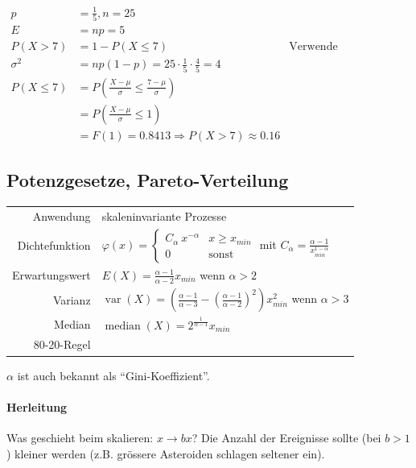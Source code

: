\documentclass[10pt,a4paper]{scrartcl}
\newif\ifincludeDerivations
\DeclareMathOperator{\var}{var}
\DeclareMathOperator{\median}{median}
\begin{document}
\begin{align*}
    p &= \frac{1}{5}, n = 25 \\
    E &= np = 5 \\
    P(X>7) &= 1-P(X\le7) & \text{Verwende Normalverteilung}\\
    \sigma^2 &= np(1-p) = 25\cdot\frac{1}{5}\cdot\frac{4}{5} = 4 \\
    P(X\le7) &= P\left(\frac{X-\mu}{\sigma}\le \frac{7-\mu}{\sigma}\right) \\
             &= P\left(\frac{X-\mu}{\sigma}\le 1\right) \\
             &= F(1) = 0.8413 \Rightarrow P(X>7) \approx 0.16
\end{align*}
\fi

\subsection{Potenzgesetze, Pareto-Verteilung}
\begin{tabular}{r p{\katalogSpaltezwei}}
Anwendung & skaleninvariante Prozesse \\
Dichtefunktion & $\varphi(x) = \begin{cases} C_\alpha\ x^{-\alpha} & x\ge x_{min} \\ 0 & \text{sonst} \end{cases}$ 
    mit $C_\alpha = \frac{\alpha-1}{x_{min}^{1-\alpha}}$ \\
Erwartungswert & $ E(X) = \frac{\alpha-1}{\alpha-2} x_{min}$ wenn $\alpha > 2$ \\
Varianz & $\var(X) = \left( \frac{\alpha-1}{\alpha-3} - \left(\frac{\alpha-1}{\alpha-2}\right)^2 \right) x_{min}^2$ wenn $\alpha>3$ \\
Median & $\median(X) = 2^{\frac{1}{\alpha-1}} x_{min}$ \\
80-20-Regel & \\
\end{tabular}

$\alpha$ ist auch bekannt als ``Gini-Koeffizient''.

\ifincludeDerivations
\paragraph{Herleitung}

Was geschieht beim skalieren: $x\longrightarrow bx$? Die Anzahl der Ereignisse sollte (bei $b>1$) kleiner werden (z.B. grössere Asteroiden schlagen seltener ein).
\end{document}
